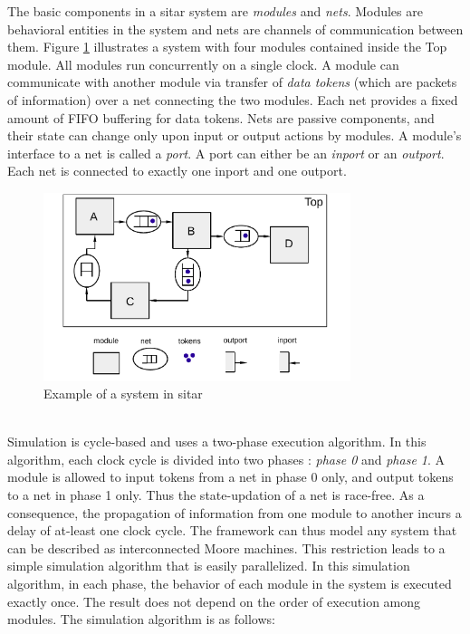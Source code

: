 \documentclass[12pt,a4paper]{report}
\begin{document}
The basic components in a sitar system are {\em modules} and {\em nets}.
Modules are behavioral entities in the system and 
nets are channels of communication between them.
Figure \ref{fig:ExecutionModel} illustrates a system 
with four modules contained inside the Top module.
%
All modules run concurrently on a single clock.  A module can communicate with
another module via transfer of {\em data tokens} (which are packets of
information) over a net connecting the two modules.  Each net provides a fixed
amount of FIFO buffering for data tokens. Nets are passive components, and
their state can change only upon input or output actions by modules.
%
A module's interface to a net is called a {\em port}. 
A port can either be an {\em inport} or an {\em outport}.
Each net is connected to exactly one inport and one outport.
%
\begin{figure}[h]
\centering
\includegraphics[width=0.8\textwidth]{ExecutionModel.pdf}
\caption{Example of a system in sitar}
\label{fig:ExecutionModel}
\end{figure}
\\

Simulation is cycle-based and uses a two-phase execution algorithm.
In this algorithm, each clock cycle is divided into two phases : {\em phase 0}
and {\em phase 1}. A module is allowed to input tokens from a net in 
phase 0 only, and output tokens to a net in phase 1 only. 
Thus the state-updation of a net is race-free.
As a consequence, the propagation of information from one
module to another incurs a delay of at-least one clock cycle.
The framework can thus model any system that can be
described as interconnected Moore machines.
%
This restriction leads to a simple simulation algorithm
that is easily parallelized. In this simulation algorithm, 
in each phase, the behavior of each module in the system is executed exactly once.
The result does not depend on the order of execution among modules.
The simulation algorithm is as follows:
\end{document}
